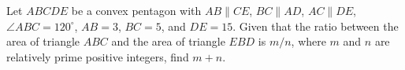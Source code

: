 Let $ABCDE$ be a convex pentagon with $AB\parallel CE$, $BC\parallel AD$, $AC\parallel DE$, $\angle ABC=120^\circ$, $AB=3$, $BC=5$, and $DE=15$. Given that the ratio between the area of triangle $ABC$ and the area of triangle $EBD$ is $m/n$, where $m$ and $n$ are relatively prime positive integers, find $m+n$.